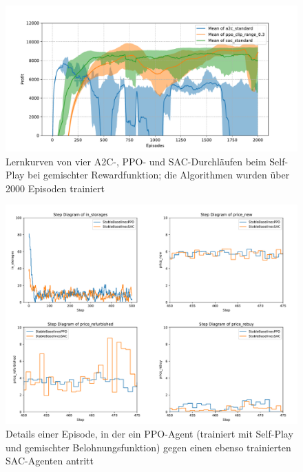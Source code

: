 \begin{figure}[htb]
	\centering
	\includegraphics[width=\textwidth]{appendix/self_play_mixed.pdf}
	\caption{Lernkurven von vier A2C-, PPO- und SAC-Durchläufen beim Self-Play bei gemischter Rewardfunktion; die Algorithmen wurden über 2000 Episoden trainiert}
	\label{graphic:SelfPlayMixedLearningCurve}
\end{figure}
\begin{figure}[htb]
	\centering
	\includegraphics[width=\textwidth]{appendix/episode_analysis_ppo_vs_sac.pdf}
	\caption{Details einer Episode, in der ein PPO-Agent (trainiert mit Self-Play und gemischter Belohnungsfunktion) gegen einen ebenso trainierten SAC-Agenten antritt}
	\label{graphic:EpisodeAnalysisPPOvsSAC}
\end{figure}
